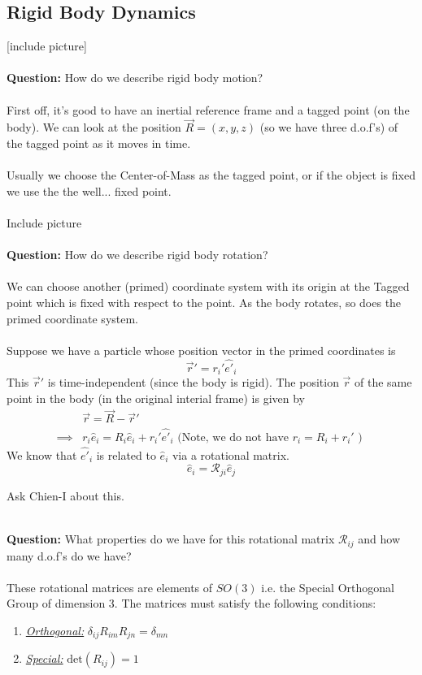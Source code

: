 \documentclass[11pt]{article}
\begin{document}
\vskip 1cm
\subsection{Rigid Body Dynamics}
[include picture]
\\
\\
\textbf{Question:} How do we describe rigid body motion? 
\\
\\
First off, it's good to have an inertial reference frame and a tagged point (on the body). We can look at the position $\vec{R} = (x, y, z)$ (so we have three d.o.f's) of the tagged point as it moves in time.
\\
\\
Usually we choose the Center-of-Mass as the tagged point, or if the object is fixed we use the the well... fixed point.
\\
\\
Include picture
\\
\\
\textbf{Question:} How do we describe rigid body rotation? 
\\
\\
We can choose another (primed) coordinate system with its origin at the Tagged point which is fixed with respect to the point. As the body rotates, so does the primed coordinate system.
\\
\\
Suppose we have a particle whose position vector in the primed coordinates is 
\[ \vec{r}' = r_i' \hat{e'}_i  \] 
This $\vec{r}'$ is time-independent (since the body is rigid). The position $\vec{r}$ of the same point in the body (in the original interial frame) is given by 
\begin{align*}
  &\vec{r} = \vec{R} - \vec{r}' \\
  \implies& r_i \hat{e}_i = R_i \hat{e}_i + r_i' \hat{e'}_i \text{  (Note, we do not have $r_i = R_i + r_i'$ ) }
\end{align*}
We know that $\hat{e'}_i$ is related to $\hat{e}_i$ via a rotational matrix.
\[ \hat{e}_i = \mathcal{R}_{ji} \hat{e}_j \]
\begin{note}
  {Ask Chien-I about this.}
\end{note}
\\
\textbf{Question:} What properties do we have for this rotational matrix $\mathcal{R}_{ij}$ and how many d.o.f's do we have?
\\
\\
These rotational matrices are elements of $SO(3)$ i.e. the Special Orthogonal Group of dimension $3$. The matrices must satisfy the following conditions:
\begin{enumerate}
  \item \underline{\textit{Orthogonal:}} $\delta_{ij} R_{im} R_{jn} = \delta_{mn}$ \\
  \item \underline{\textit{Special:}} $\mathrm{det}(R_{ij}) = 1$
\end{enumerate}
\end{document}

